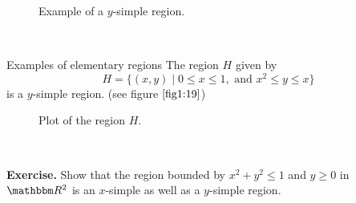 \documentclass[../Analysis-3.tex]{subfiles}
\begin{document}
\begin{figure}[H]
    \centering
    \caption{Example of a $y$-simple region.}
\end{figure}

\

\begin{Eg}{Examples of elementary regions}{}
    The region $H$ given by
    \[
        H = \{ (x,y) \mid 0 \leq x \leq 1, \mbox{ and } x^2 \leq y \leq x \}
    \]
    is a $y$-simple region. (see figure $\ref{fig1:19}$)
    \begin{figure}[H]
        \centering
        \caption{Plot of the region $H$.}
        \label{fig1:19}
    \end{figure}
\end{Eg}
\

\textbf{Exercise.} Show that the region bounded by $x^2 + y^2 \leq 1$ and $y \geq 0$ in $\R^2$ is an $x$-simple as well as a $y$-simple region.
\end{document}

